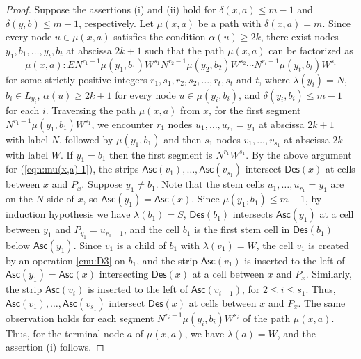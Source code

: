 \documentclass[a4paper,11pt,reqno]{amsart}
\theoremstyle{definition}
\numberwithin{equation}{section}
\newcommand{\Des}{{\textsf{Des}}}
\newcommand{\Asc}{{\textsf{Asc}}}
\begin{document}
\begin{proof}
Suppose the assertions (i) and (ii) hold for $\delta(x,a)\le m-1$ and  $\delta(y,b)\le m-1$, respectively. Let $\mu(x,a)$ be a path with $\delta(x,a)=m$. Since every node $u\in\mu(x,a)$ satisfies the condition $\alpha(u)\ge 2k$, there exist nodes $y_1, b_1, \dots, y_t, b_t$ at abscissa $2k+1$ such that the path $\mu(x,a)$ can be factorized as
\begin{equation} \label{eqn:factorization-i}
\mu(x,a): EN^{r_1-1}\mu(y_1,b_1)W^{s_1}N^{r_2-1}\mu(y_2,b_2)W^{s_2}\cdots N^{r_t-1}\mu(y_t,b_t)W^{s_t}
\end{equation}
for some strictly positive integers $r_1,s_1,r_2,s_2,\dots,r_t,s_t$ and $t$, where $\lambda(y_i)=N$, $b_i\in L_{y_i}$, $\alpha(u)\ge 2k+1$ for every node $u\in\mu(y_i,b_i)$, and $\delta(y_i,b_i)\le m-1$ for each $i$. Traversing the path $\mu(x,a)$ from $x$, for the first segment $N^{r_1-1}\mu(y_1,b_1)W^{s_1}$, we encounter $r_1$ nodes $u_1,\dots,u_{r_1}=y_1$ at abscissa $2k+1$ with label $N$, followed by $\mu(y_1,b_1)$ and then $s_1$ nodes $v_1,\dots,v_{s_1}$ at abscissa $2k$ with label $W$. If $y_1=b_1$ then the first segment is $N^{r_1}W^{s_1}$. By the above argument for (\ref{eqn:mu(x,a)-1}), the strips $\Asc(v_1),\dots,\Asc(v_{s_1})$ intersect $\Des(x)$ at cells between $x$ and $P_x$. 
Suppose $y_1\neq b_1$.
Note that the stem cells $u_1,\dots,u_{r_1}=y_1$ are on the $N$ side of $x$, so $\Asc(y_1)=\Asc(x)$. Since $\mu(y_1,b_1)\le m-1$, by induction hypothesis we have $\lambda(b_1)=S$,  $\Des(b_1)$ intersects $\Asc(y_1)$ at a cell between $y_1$ and $P_{y_1}=u_{r_1-1}$, and the cell $b_1$ is the first stem cell in $\Des(b_1)$ below $\Asc(y_1)$. Since $v_1$ is a child of $b_1$ with $\lambda(v_1)=W$, the cell $v_1$ is created by an operation \ref{enu:D3} on $b_1$, and the strip $\Asc(v_1)$ is inserted to the left of $\Asc(y_1)=\Asc(x)$ intersecting $\Des(x)$ at a cell between $x$ and $P_x$. Similarly, the strip $\Asc(v_i)$ is inserted to the left of $\Asc(v_{i-1})$, for $2\le i\le s_1$. Thus,  $\Asc(v_1),\dots,\Asc(v_{s_1})$ intersect $\Des(x)$ at cells between $x$ and $P_x$. The same observation holds for each segment $N^{r_i-1}\mu(y_i,b_i)W^{s_i}$ of the path $\mu(x,a)$. Thus, for the terminal node $a$ of $\mu(x,a)$, we have $\lambda(a)=W$, and the assertion (i) follows.


\end{proof}
\end{document}
